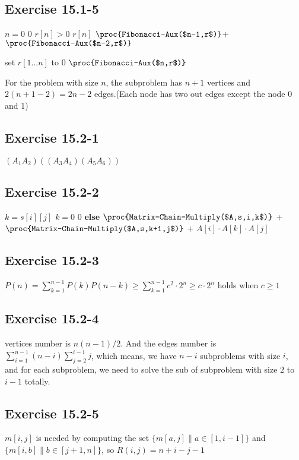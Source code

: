 \documentclass[12pt]{article}
\theoremstyle{definition}
\theoremstyle{remark}
\begin{document}
\subsection*{Exercise 15.1-5}
\begin{codebox}
\li \If $n=0$ \label{li:if}
\li \quad \Return $0$
\li \If $r[n]>0$ \label{li:if}
\li \quad \Return $r[n]$
\li \Return $\proc{Fibonacci-Aux($n-1,r$)}$+$\proc{Fibonacci-Aux($n-2,r$)}$
\end{codebox}
\begin{codebox}
\li set $r[1...n]$ to 0
\li \Return $\proc{Fibonacci-Aux($n,r$)}$
\end{codebox}
For the problem with size $n$, the subproblem has $n+1$ vertices and $2(n+1-2)=2n-2$ edges.(Each node has two out edges except the node 0 and 1)
\subsection*{Exercise 15.2-1}
$(A_1A_2)((A_3A_4)(A_5A_6))$
\subsection*{Exercise 15.2-2}
\begin{codebox}
\li $k=s[i][j]$
\li \If $k=0$ \label{li:if}
\li \quad \Return $0$
\li \textbf{else}
\li \quad \Return $\proc{Matrix-Chain-Multiply($A,s,i,k$)}$ +
\li \quad $\proc{Matrix-Chain-Multiply($A,s,k+1,j$)}$ +
\li \quad $A[i]\cdot A[k]\cdot A[j]$
\end{codebox}
\subsection*{Exercise 15.2-3}
$P(n)=\sum_{k=1}^{n-1}P(k)P(n-k)\ge \sum_{k=1}^{n-1}c^2\cdot 2^n\ge c\cdot 2^n$ holds when $c\ge 1$
\subsection*{Exercise 15.2-4}
vertices number is $n(n-1)/2$. And the edges number is $\sum_{i=1}^{n-1}(n-i)\sum_{j=2}^{i-1}j$, which means, we have $n-i$ subproblems with size $i$, and for each subproblem, we need to solve the sub of subproblem with size $2$ to $i-1$ totally.
\subsection*{Exercise 15.2-5}
$m[i,j]$ is needed by computing the set $\{m[a,j]\|a\in[1,i-1]\}$ and $\{m[i,b]\|b\in[j+1,n]\}$, so $R(i,j)=n+i-j-1$
\end{document}
